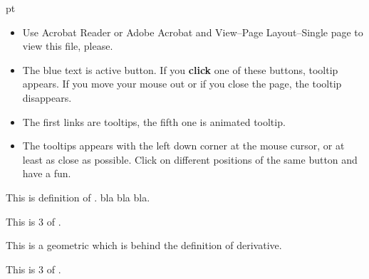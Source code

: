 \documentclass{article}
\def\Message#1{\colorbox{bkg}{
      \begin{minipage}{1\linewidth}
        \smallskip
      #1
        \smallskip
      \end{minipage}
 }}
\begin{document}
 pt

\Message{
\begin{itemize}
\item Use Acrobat Reader or Adobe Acrobat and View--Page
  Layout--Single page to view this file, please.
\item The blue text is active button. If you \textbf{click} one of
  these buttons, tooltip appears. If you move your mouse out or if you
  close the page, the tooltip disappears.
\item The first links are tooltips, the fifth one is animated tooltip.
\item The tooltips appears with the left down corner at the mouse
  cursor, or at least as close as possible. Click on different
  positions of the same button and have a fun.
\end{itemize}
}

\begin{definice}
  This is definition of  . bla bla bla.
\end{definice}

\pause
\begin{definice}
  This is 3 of \hfill
  .
\end{definice}

\pause
This is a geometric  which is behind the
definition of derivative.


\pause
\vfill 
\begin{definice}
  This is 3 of \hfill
  .
\end{definice}
\end{document}
